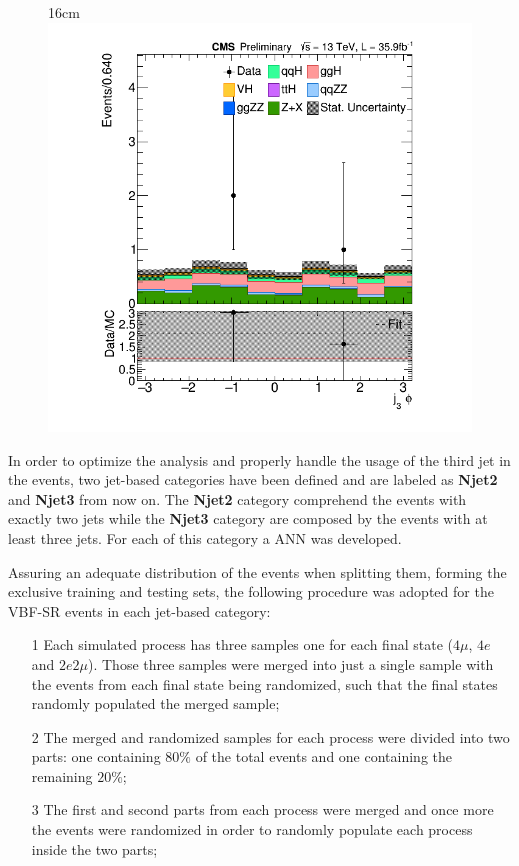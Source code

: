 \begin{figure}[hbtp]{16cm}
{		\includegraphics[scale=0.23,trim={2cm 1cm 2cm 1cm},clip]{ChapterAnalysis/figs/vbf_j3_phi}
	}	
	\label{fig:ann_input_variables}
\end{figure}


In order to optimize the analysis and properly handle the usage of the third jet in the events, two jet-based categories have been defined and are labeled as \textbf{Njet2} and \textbf{Njet3} from now on. The \textbf{Njet2} category comprehend the events with exactly two jets while the \textbf{Njet3} category are composed by the events with at least three jets. For each of this category a ANN was developed.

Assuring an adequate distribution of the events when splitting them, forming the exclusive training and testing sets, the following procedure was adopted for the VBF-SR events in each jet-based category:
\begin{itemize}
	\item[1] Each simulated process has three samples one for each final state ($4\mu$, $4e$ and $2e2\mu$). Those three samples were merged into just a single sample with the events from each final state being randomized, such that the final states randomly populated the merged sample;
	\item[2] The merged and randomized samples for each process were divided into two parts: one containing $80\%$ of the total events and one containing the remaining $20\%$;
	\item[3] The first and second parts from each process were merged and once more the events were randomized in order to randomly populate each process inside the two parts;
\end{itemize}


